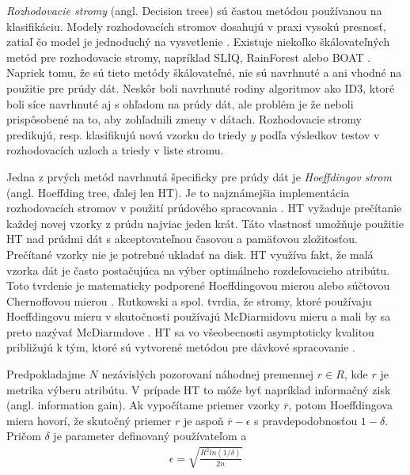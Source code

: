 \textit{Rozhodovacie stromy} (angl. Decision trees) sú častou metódou používanou na klasifikáciu. Modely rozhodovacích stromov dosahujú v praxi vysokú presnosť, zatiaľ čo model je jednoduchý na vysvetlenie \citep{jin2003efficient, hulten2001mining, domingos2000mining, aggarwal2014survey}. Existuje niekoľko škálovateľných metód pre rozhodovacie stromy, napríklad SLIQ, RainForest alebo BOAT \citep{aggarwal2014survey}. Napriek tomu, že sú tieto metódy škálovateľné, nie sú navrhnuté a ani vhodné na použitie pre prúdy dát. Neskôr boli navrhnuté rodiny algoritmov ako ID3, ktoré boli síce navrhnuté aj s ohľadom na prúdy dát, ale problém je že neboli prispôsobené na to, aby  zohľadnili zmeny v dátach. Rozhodovacie stromy predikujú, resp. klasifikujú novú vzorku do triedy $y$ podľa výsledkov testov v rozhodovacích uzloch a triedy v liste stromu.
\par
Jedna z prvých metód navrhnutá špecificky pre prúdy dát je \textit{Hoeffdingov strom} (angl. Hoeffding tree, ďalej len HT).  Je to najznámejšia implementácia rozhodovacích stromov v použití prúdového spracovania \citep{domingos2000mining, aggarwal2014survey, nguyen2015survey}. HT vyžaduje prečítanie každej novej vzorky z prúdu najviac jeden krát. Táto vlastnosť umožňuje použitie HT nad prúdmi dát s akceptovateľnou časovou a pamäťovou zložitosťou. Prečítané vzorky nie je potrebné ukladať na disk. HT využíva fakt, že malá vzorka dát je často postačujúca na výber optimálneho rozdeľovacieho atribútu. Toto tvrdenie je matematicky podporené Hoeffdingovou mierou alebo súčtovou Chernoffovou mierou \citep{domingos2000mining, han2011data}. Rutkowski a spol. tvrdia, že stromy, ktoré používaju Hoeffdingovu mieru v skutočnosti používajú McDiarmidovu mieru a mali by sa preto nazývať McDiarmdove \citep{rutkowski2013decision}. HT sa vo všeobecnosti asymptoticky kvalitou približujú k tým, ktoré sú vytvorené metódou pre dávkové spracovanie \citep{hall2009weka}.
\par
Predpokladajme $N$ nezávislých pozorovaní náhodnej premennej $r \in R$, kde $r$ je metrika výberu atribútu. V prípade HT to môže byť napríklad informačný zisk (angl. information gain). Ak vypočítame priemer vzorky $\overline{r}$, potom Hoeffdingova miera hovorí, že skutočný priemer $r$ je aspoň $\overline{r}-\epsilon$ s pravdepodobnosťou $1-\delta$. Pričom $\delta$ je parameter definovaný používateľom a 
\begin{align*}
\epsilon = \sqrt{ \frac{R^2ln(1/\delta)} {2n} }
\end{align*}
